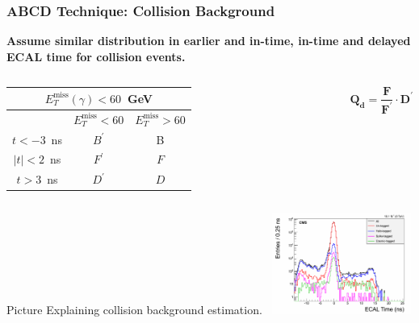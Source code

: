 \documentclass{beamer}
\begin{document}
\begin{frame}
\frametitle{ABCD Technique: Collision Background}
 \begin{minipage}[t]{0.8\paperwidth}
\vspace{-0.75cm}
  \begin{varblock}[7.2cm]{\textbf{Assume similar distribution in earlier and in-time, in-time and delayed ECAL time for collision events.}}
   \begin{columns}
      \centering
        \begin{tabular}{|c || c|| c|}
        \multicolumn{3}{c}{\bfseries{$E^{\mbox{miss}}_{T}(\gamma) < 60$~GeV}} \\
        \hline \hline
          & $ E^{\mbox{miss}}_{T} < 60$ & $E^{\mbox{miss}}_{T} > 60$ \\       
          \hline \hline
          $ t < -3$~ns & $B^{\prime}$ &  B \\
          \hline \hline \hline    
          $ |t| < 2$~ns & $F^{\prime}$ &  $F$ \\
          \hline \hline \hline
          $ t > 3$~ns & $D^{\prime}$ &  $D$ \\
        \hline \hline
        \end{tabular} 
      \begin{tcolorbox}[colback=blue!5,colframe=UMN@Gold!40]
      \begin{equation*}
      \mathbf{Q_{d} = \frac{F}{F^{\prime}}\cdot D^{\prime} }
     \end{equation*}
     \end{tcolorbox}
    \end{columns}
\end{varblock}
\end{minipage}
\begin{minipage}[b]{\paperwidth}
Picture Explaining collision background estimation. 
\mbox{
 \includegraphics[height=3.30cm,width=0.7\paperwidth]{THESISPLOTS/TimeForAll.png}
 } 
\end{minipage}
\end{frame}
\end{document}
